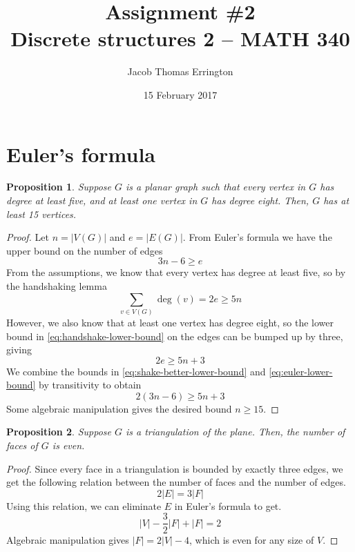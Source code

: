 \documentclass[12pt,letterpaper]{article}
\author{Jacob Thomas Errington}
\date{15 February 2017}
\title{Assignment \#2\\Discrete structures 2 -- MATH 340}
\newcommand{\question}{\section}
\newtheorem{prop}{Proposition}
\DeclareMathOperator{\degOp}{deg}
\newcommand{\parens}[1]{\left(#1\right)}
\renewcommand{\deg}[1]{\degOp{\parens{#1}}}
\begin{document}
\maketitle

\question{Euler's formula}

\begin{prop}
    Suppose $G$ is a planar graph such that every vertex in $G$ has degree at
    least five, and at least one vertex in $G$ has degree eight.
    Then, $G$ has at least 15 vertices.
\end{prop}

\begin{proof}
    Let $n = |V(G)|$ and $e = |E(G)|$.
    From Euler's formula we have the upper bound on the number of edges
    \begin{equation}
        \label{eq:euler-lower-bound}
        3n - 6 \geq e
    \end{equation}
    From the assumptions, we know that every vertex has degree at least five,
    so by the handshaking lemma
    \begin{equation}
        \label{eq:handshake-lower-bound}
        \sum_{v \in V(G)} \deg{v} = 2 e \geq 5 n
    \end{equation}
    However, we also know that at least one vertex has degree eight, so the
    lower bound in \eqref{eq:handshake-lower-bound} on the edges can be bumped
    up by three, giving
    \begin{equation}
        \label{eq:shake-better-lower-bound}
        2 e \geq 5 n + 3
    \end{equation}
    We combine the bounds in \eqref{eq:shake-better-lower-bound} and
    \eqref{eq:euler-lower-bound} by transitivity to obtain
    \begin{equation*}
        2(3n - 6) \geq 5n + 3
    \end{equation*}
    Some algebraic manipulation gives the desired bound $n \geq 15$.
\end{proof}

\begin{prop}
    Suppose $G$ is a triangulation of the plane. Then, the number of faces of
    $G$ is even.
\end{prop}

\begin{proof}
    Since every face in a triangulation is bounded by exactly three edges, we
    get the following relation between the number of faces and the number of
    edges.
    \begin{equation*}
        \label{eq:tri-face-edge-rel}
        2 |E| = 3 |F|
    \end{equation*}
    Using this relation, we can eliminate $E$ in Euler's formula to get.
    \begin{equation*}
        |V| - \frac{3}{2} |F| + |F| = 2
    \end{equation*}
    Algebraic manipulation gives $|F| = 2|V| - 4$, which is even for any size
    of $V$.
\end{proof}
\end{document}
